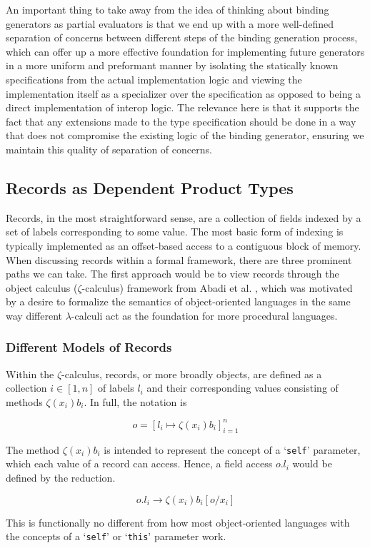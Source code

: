 An important thing to take away from the idea of thinking about binding generators as partial evaluators is that we end up with a more well-defined separation of concerns between different steps of the binding generation process, which can offer up a more effective foundation for implementing future generators in a more uniform and preformant manner by isolating the statically known specifications from the actual implementation logic and viewing the implementation itself as a specializer over the specification as opposed to being a direct implementation of interop logic. The relevance here is that it supports the fact that any extensions made to the type specification should be done in a way that does not compromise the existing logic of the binding generator, ensuring we maintain this quality of separation of concerns.

\subsection{Records as Dependent Product Types}\label{s:record_type_model}

Records, in the most straightforward sense, are a collection of fields indexed by a set of labels corresponding to some value. The most basic form of indexing is typically implemented as an offset-based access to a contiguous block of memory. When discussing records within a formal framework, there are three prominent paths we can take. The first approach would be to view records through the object calculus ($\zeta$-calculus) framework from Abadi et al. \cite{Abadi1996Theory}, which was motivated by a desire to formalize the semantics of object-oriented languages in the same way different $\lambda$-calculi act as the foundation for more procedural languages. 

\subsubsection{Different Models of Records}

\begin{definition}
Within the $\zeta$-calculus, records, or more broadly objects, are defined as a collection $i\in[1, n]$ of labels $l_i$ and their corresponding values consisting of methods $\zeta(x_i)b_i$. In full, the notation is 

\begin{equation}
  o = [l_i \mapsto \zeta(x_i)b_i]_{i=1}^n
\end{equation}

The method $\zeta(x_i)b_i$ is intended to represent the concept of a `\texttt{self}' parameter, which each value of a record can access. Hence, a field access $o.l_i$ would be defined by the reduction. 

\begin{equation}
  o.l_i \rightarrow \zeta(x_i)b_i[o/x_i]
\end{equation}

This is functionally no different from how most object-oriented languages with the concepts of a `\texttt{self}' or `\texttt{this}' parameter work. 

\end{definition}

